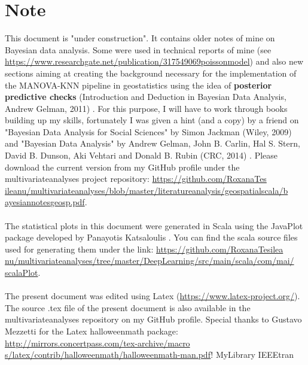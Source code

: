 \documentclass {article}
\begin{document}
\section* {Note}
This document is "under construction".
 It contains older notes of mine on Bayesian data analysis.
 Some were used in technical reports of mine (see \href{https://www.researchgate.net/publication/317549069_poisson_model}{https://www.researchgate.net/publication/317549069\underline{\space}poisson\underline{\space}model}) and also new sections aiming at creating the background necessary for the implementation of the MANOVA-KNN pipeline in geostatistics using the idea of \textbf{posterior predictive checks} (Introduction and Deduction in Bayesian Data Analysis, Andrew Gelman, 2011) \cite{gelman_introduction_2011}.
 For this purpose, I will have to work through books building up my skills, fortunately I was given a hint (and a copy) by a friend on "Bayesian Data Analysis for Social Sciences" by Simon Jackman (Wiley, 2009) \cite{jackman_bayesian_2009} and "Bayesian Data Analysis" by Andrew Gelman, John B. Carlin, Hal S. Stern, David B. Dunson, Aki Vehtari and Donald B. Rubin (CRC, 2014) \cite{gelman_bayesian_2014}.    
Please download the current version from  my GitHub profile under the multivariate\underline{\space}analyses project repository: \href{https://github.com/RoxanaTesileanu/multivariate_analyses/blob/master/literature_analysis/geospatial_scala/bayesian_notes_geosp.tex}{https://github.com/RoxanaTes\\ileanu/multivariate\underline{\space}analyses/blob/master/literature\underline{\space}analysis/geospatial\underline{\space}scala/b\\ayesian\underline{\space}notes\underline{\space}geosp.pdf}. 
\\
\\
The statistical plots in this document were generated in Scala using the JavaPlot package developed by Panayotis Katsaloulis \cite{panayotis_javaplot_2017}. You can find the scala source files used for generating them under the link: 
\href{https://github.com/RoxanaTesileanu/multivariate_analyses/tree/master/DeepLearning/src/main/scala/com/mai/scalaPlot}{https://github.com/RoxanaTesilea\\nu/multivariate\underline{\space}analyses/tree/master/DeepLearning/src/main/scala/com/mai/\\scalaPlot}.  
\\
\\
The present document was edited using Latex \cite{claudio_latex-tutorial.com_nodate} (\href{https://www.latex-project.org/}{https://www.latex-project.org/}). The source .tex file of the present document is also available in the multivariate\underline{\space}analyses repository on my GitHub profile. Special thanks to Gustavo Mezzetti for the Latex halloweenmath package:
\href{http://mirrors.concertpass.com/tex-archive/macros/latex/contrib/halloweenmath/halloweenmath-man.pdf}{http://mirrors.concertpass.com/tex-archive/macro\\s/latex/contrib/halloweenmath/halloweenmath-man.pdf}!  
 {MyLibrary}
 {IEEEtran}
\end{document}
